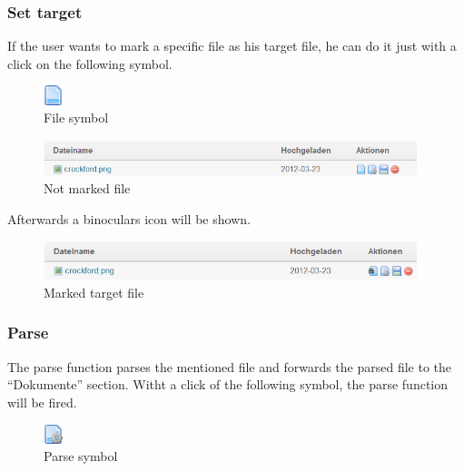 \subsubsection{Set target}

If the user wants to mark a specific file as his target file, he can do it just with a click on the following symbol.

\begin{figure}[!h]
  \centering
    \includegraphics[width=0.05\textwidth]{images/page.png}
  \caption{File symbol}
  \label{fig: file symbol}
\end{figure}

\begin{figure}[!h]
  \centering
    \includegraphics[width=0.97\textwidth]{images/basic_functionalities/set_target1.png}
  \caption{Not marked file}
  \label{fig:not marked file}
\end{figure}

Afterwards a binoculars icon will be shown.

\begin{figure}[!h]
  \centering
    \includegraphics[width=0.97\textwidth]{images/basic_functionalities/set_target2.png}
  \caption{Marked target file}
  \label{fig:marked target file}
\end{figure}

\subsubsection{Parse}

The parse function parses the mentioned file and forwards the parsed file to the \enquote{Dokumente} section.
Witht a click of the following symbol, the parse function will be fired.

\begin{figure}[!h]
  \centering
    \includegraphics[width=0.05\textwidth]{images/page_gear.png}
  \caption{Parse symbol}
  \label{fig:parse symbol}
\end{figure}

